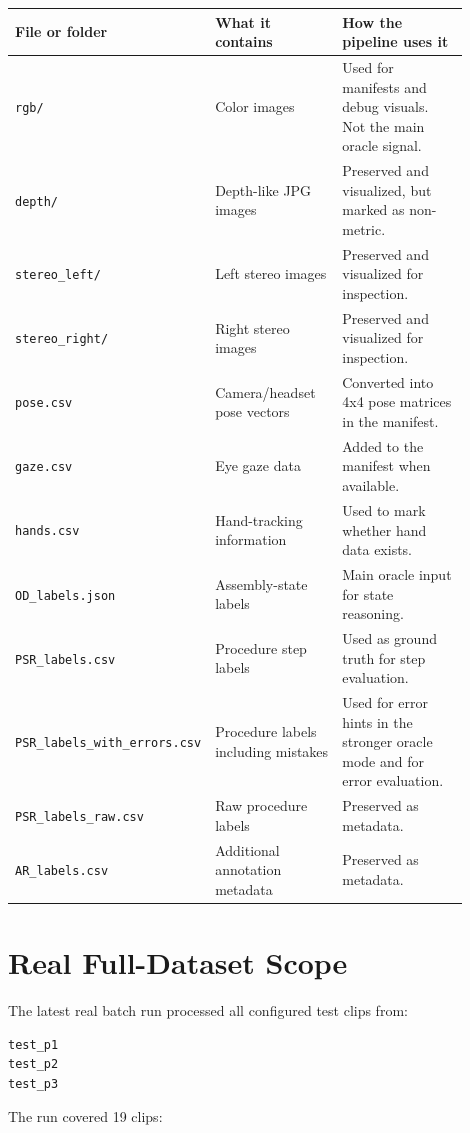 \documentclass[11pt,a4paper]{article}
\begin{document}
\begin{longtable}{p{0.25\linewidth} p{0.30\linewidth} p{0.35\linewidth}}
\toprule
\textbf{File or folder} & \textbf{What it contains} & \textbf{How the pipeline uses it} \\
\midrule
\endhead
\texttt{rgb/} & Color images & Used for manifests and debug visuals. Not the main oracle signal. \\
\texttt{depth/} & Depth-like JPG images & Preserved and visualized, but marked as non-metric. \\
\texttt{stereo\_left/} & Left stereo images & Preserved and visualized for inspection. \\
\texttt{stereo\_right/} & Right stereo images & Preserved and visualized for inspection. \\
\texttt{pose.csv} & Camera/headset pose vectors & Converted into 4x4 pose matrices in the manifest. \\
\texttt{gaze.csv} & Eye gaze data & Added to the manifest when available. \\
\texttt{hands.csv} & Hand-tracking information & Used to mark whether hand data exists. \\
\texttt{OD\_labels.json} & Assembly-state labels & Main oracle input for state reasoning. \\
\texttt{PSR\_labels.csv} & Procedure step labels & Used as ground truth for step evaluation. \\
\texttt{PSR\_labels\_with\_errors.csv} & Procedure labels including mistakes & Used for error hints in the stronger oracle mode and for error evaluation. \\
\texttt{PSR\_labels\_raw.csv} & Raw procedure labels & Preserved as metadata. \\
\texttt{AR\_labels.csv} & Additional annotation metadata & Preserved as metadata. \\
\bottomrule
\end{longtable}

\section{Real Full-Dataset Scope}

The latest real batch run processed all configured test clips from:

\begin{lstlisting}
test_p1
test_p2
test_p3
\end{lstlisting}

The run covered 19 clips:
\end{document}
